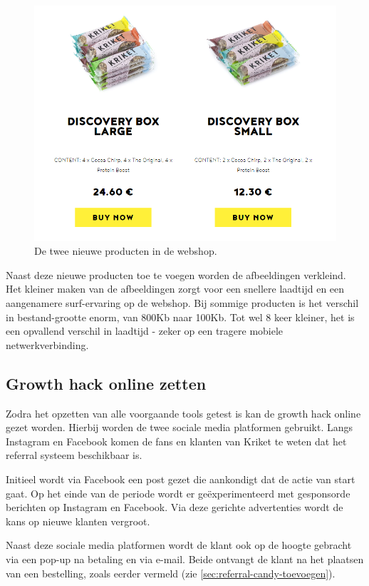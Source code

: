 \begin{figure}[h!]
	\includegraphics[width=\linewidth]{img/discovery-box-webshop.png}
	\caption{De twee nieuwe producten in de webshop.}
	\label{fig:discovery-box-webshop}
\end{figure}

Naast deze nieuwe producten toe te voegen worden de afbeeldingen verkleind. Het kleiner maken van de afbeeldingen zorgt voor een snellere laadtijd en een aangenamere surf-ervaring op de webshop. Bij sommige producten is het verschil in bestand-grootte enorm, van 800Kb naar 100Kb. Tot wel 8 keer kleiner, het is een opvallend verschil in laadtijd - zeker op een tragere mobiele netwerkverbinding.

\subsection{Growth hack online zetten} \label{sec:growth-hack-online-zetten}
Zodra het opzetten van alle voorgaande tools getest is kan de growth hack online gezet worden. Hierbij worden de twee sociale media platformen gebruikt. Langs Instagram en Facebook komen de fans en klanten van Kriket te weten dat het referral systeem beschikbaar is. 

Initieel wordt via Facebook een post gezet die aankondigt dat de actie van start gaat. Op het einde van de periode wordt er geëxperimenteerd met gesponsorde berichten op Instagram en Facebook. Via deze gerichte advertenties wordt de kans op nieuwe klanten vergroot.

Naast deze sociale media platformen wordt de klant ook op de hoogte gebracht via een pop-up na betaling en via e-mail. Beide ontvangt de klant na het plaatsen van een bestelling, zoals eerder vermeld (zie \ref{sec:referral-candy-toevoegen}). 


